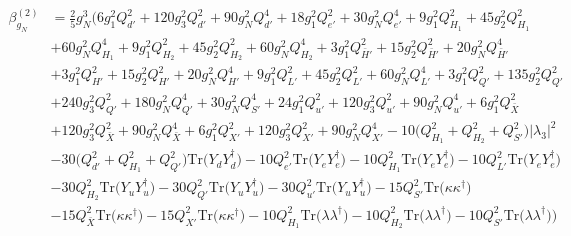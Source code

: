 {\begin{align}
\beta_{g_N}^{(2)} & =  
\frac{2}{5} g_{N}^{3} \Big(6 g_{1}^{2} Q_{d'}^{2} +120 g_{3}^{2} Q_{d'}^{2} +90 g_{N}^{2} Q_{d'}^{4} +18 g_{1}^{2} Q_{e'}^{2} +30 g_{N}^{2} Q_{e'}^{4} +9 g_{1}^{2} Q_{H_1}^{2} +45 g_{2}^{2} Q_{H_1}^{2} \nonumber \\ 
 &+60 g_{N}^{2} Q_{H_1}^{4} +9 g_{1}^{2} Q_{H_2}^{2} +45 g_{2}^{2} Q_{H_2}^{2} +60 g_{N}^{2} Q_{H_2}^{4} +3 g_{1}^{2} Q_{\bar{H}'}^{2} +15 g_{2}^{2} Q_{\bar{H}'}^{2} +20 g_{N}^{2} Q_{\bar{H}'}^{4} \nonumber \\ 
 &+3 g_{1}^{2} Q_{H'}^{2} +15 g_{2}^{2} Q_{H'}^{2} +20 g_{N}^{2} Q_{H'}^{4} +9 g_{1}^{2} Q_{L'}^{2} +45 g_{2}^{2} Q_{L'}^{2} +60 g_{N}^{2} Q_{L'}^{4} +3 g_{1}^{2} Q_{Q'}^{2} +135 g_{2}^{2} Q_{Q'}^{2} \nonumber \\ 
 &+240 g_{3}^{2} Q_{Q'}^{2} +180 g_{N}^{2} Q_{Q'}^{4} +30 g_{N}^{2} Q_{S'}^{4} +24 g_{1}^{2} Q_{u'}^{2} +120 g_{3}^{2} Q_{u'}^{2} +90 g_{N}^{2} Q_{u'}^{4} +6 g_{1}^{2} Q_{\bar{X}}^{2} \nonumber \\ 
 &+120 g_{3}^{2} Q_{\bar{X}}^{2} +90 g_{N}^{2} Q_{\bar{X}}^{4} +6 g_{1}^{2} Q_{X'}^{2} +120 g_{3}^{2} Q_{X'}^{2} +90 g_{N}^{2} Q_{X'}^{4} -10 \Big(Q_{H_1}^{2} + Q_{H_2}^{2} + Q_{S'}^{2}\Big)|\lambda_3|^2 \nonumber \\ 
 &-30 \Big(Q_{d'}^{2} + Q_{H_1}^{2} + Q_{Q'}^{2}\Big)\mbox{Tr}\Big({Y_d  Y_{d}^{\dagger}}\Big) -10 Q_{e'}^{2} \mbox{Tr}\Big({Y_e  Y_{e}^{\dagger}}\Big) -10 Q_{H_1}^{2} \mbox{Tr}\Big({Y_e  Y_{e}^{\dagger}}\Big) -10 Q_{L'}^{2} \mbox{Tr}\Big({Y_e  Y_{e}^{\dagger}}\Big) \nonumber \\ 
 &-30 Q_{H_2}^{2} \mbox{Tr}\Big({Y_u  Y_{u}^{\dagger}}\Big) -30 Q_{Q'}^{2} \mbox{Tr}\Big({Y_u  Y_{u}^{\dagger}}\Big) -30 Q_{u'}^{2} \mbox{Tr}\Big({Y_u  Y_{u}^{\dagger}}\Big) -15 Q_{S'}^{2} \mbox{Tr}\Big({\kappa  \kappa^{\dagger}}\Big) \nonumber \\ 
 &-15 Q_{\bar{X}}^{2} \mbox{Tr}\Big({\kappa  \kappa^{\dagger}}\Big) -15 Q_{X'}^{2} \mbox{Tr}\Big({\kappa  \kappa^{\dagger}}\Big) -10 Q_{H_1}^{2} \mbox{Tr}\Big({\lambda  \lambda^{\dagger}}\Big) -10 Q_{H_2}^{2} \mbox{Tr}\Big({\lambda  \lambda^{\dagger}}\Big) -10 Q_{S'}^{2} \mbox{Tr}\Big({\lambda  \lambda^{\dagger}}\Big) \Big)
\end{align}} 

